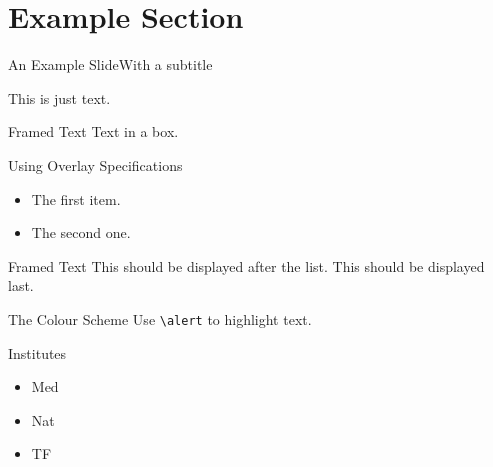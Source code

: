 \section{Example Section}
\begin{frame}[t]{An Example Slide}{With a subtitle}

This is just text.\hfill

\begin{block}{Framed Text}
Text in a box.
\end{block}
\end{frame}
\begin{frame}{Using Overlay Specifications}
\begin{itemize}[<+(1)->]
\item The first item.
\item The second one.
\end{itemize}
\pause
\begin{block}{Framed Text}
This should be displayed after the list.
\pause
This should be displayed last.
\end{block}
\end{frame}
\begin{frame}{The Colour Scheme}
Use \texttt{\textbackslash alert} to highlight \alert{text}.
\end{frame}

\begin{frame}{Institutes}
\begin{itemize}
\item Med
\item Nat
\item TF
\end{itemize}
\end{frame}